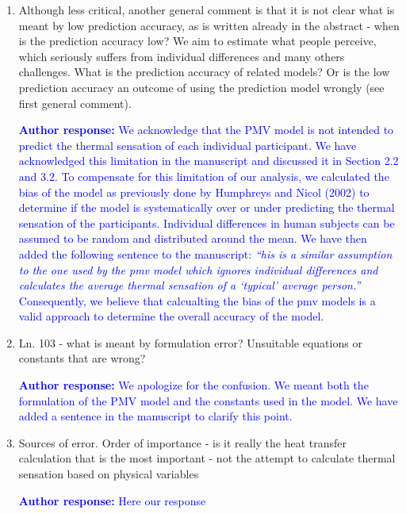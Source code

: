 \documentclass[a4paper, 10pt]{letter}
\newcommand{\response}[1]{\textcolor{blue}{\textbf{Author response:} #1}}
\begin{document}
\begin{letter}
\begin{enumerate}
            \item Although less critical, another general comment is that it is not clear what is meant by low prediction accuracy, as is written already in the abstract - when is the prediction accuracy low?
            We aim to estimate what people perceive, which seriously suffers from individual differences and many others challenges.
            What is the prediction accuracy of related models?
            Or is the low prediction accuracy an outcome of using the prediction model wrongly (see first general comment).

            \response{
                We acknowledge that the PMV model is not intended to predict the thermal sensation of each individual participant.
                We have acknowledged this limitation in the manuscript and discussed it in Section 2.2 and 3.2.
                To compensate for this limitation of our analysis, we calculated the bias of the model as previously done by Humphreys and Nicol (2002) to determine if the model is systematically over or under predicting the thermal sensation of the participants.
                Individual differences in human subjects can be assumed to be random and distributed around the mean.
                We have then added the following sentence to the manuscript: \textit{``his is a similar assumption to the one used by the \ac{pmv} model which ignores individual differences and calculates the average thermal sensation of a `typical' average person.''}
                Consequently, we believe that calcualting the bias of the \ac{pmv} models is a valid approach to determine the overall accuracy of the model.
            }

            \item Ln. 103 - what is meant by formulation error?
            Unsuitable equations or constants that are wrong?

            \response{
                We apologize for the confusion.
                We meant both the formulation of the PMV model and the constants used in the model.
                We have added a sentence in the manuscript to clarify this point.
            }

            \item Sources of error.
            Order of importance - is it really the heat transfer calculation that is the most important - not the attempt to calculate thermal sensation based on physical variables

            \response{Here our response}


\end{enumerate}
\end{letter}
\end{document}
